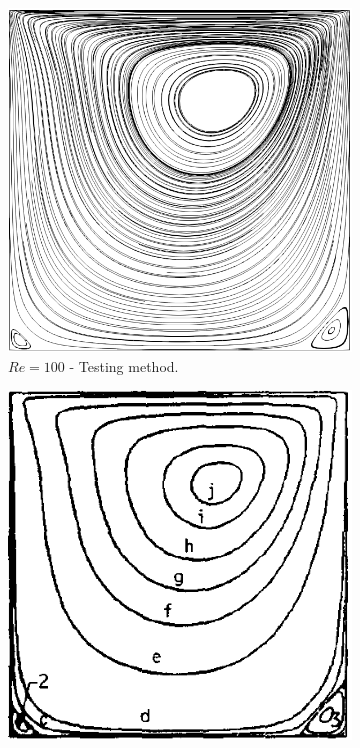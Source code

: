 \begin{figure}[H]
    \centering
    \begin{subfigure}[t]{0.450\textwidth}
        \includegraphics[width=\textwidth]{Images/Sub-figures_Example/cavity_100_streamlines.png}
        \caption*{$Re = 100$ - Testing method.}
    \end{subfigure}
    \begin{subfigure}[t]{0.441\textwidth}
        \includegraphics[width=\textwidth]{Images/Sub-figures_Example/cavity_100_streamlines_ghia.png}

\end{subfigure}
\end{figure}
